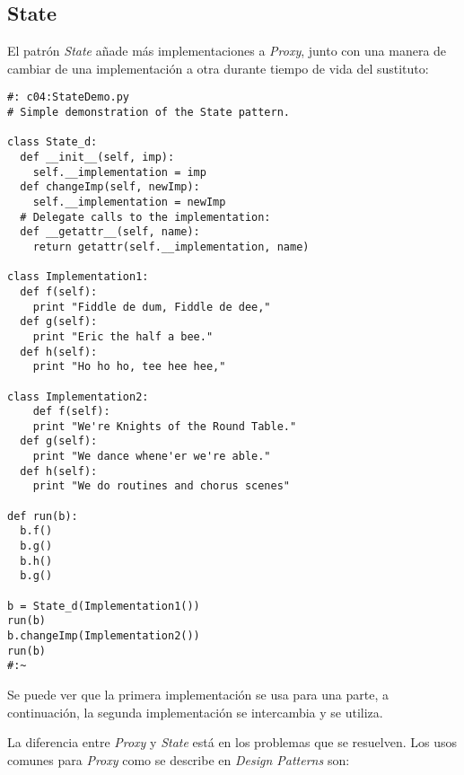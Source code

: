 \newpage

\subsection*{State}
\label{subsec:State}

El patrón \textit{State} añade más implementaciones a \textit{Proxy}, junto con una manera de cambiar de una implementación a otra durante tiempo de vida del sustituto: \newline

\begin{lstlisting} 
#: c04:StateDemo.py 
# Simple demonstration of the State pattern.

class State_d: 
  def __init__(self, imp):  
    self.__implementation = imp  
  def changeImp(self, newImp): 
    self.__implementation = newImp 
  # Delegate calls to the implementation: 
  def __getattr__(self, name): 
    return getattr(self.__implementation, name) 
    
class Implementation1: 
  def f(self):  
    print "Fiddle de dum, Fiddle de dee,"  
  def g(self):  
    print "Eric the half a bee."  
  def h(self):  
    print "Ho ho ho, tee hee hee,"  
    
class Implementation2: 
    def f(self):  
    print "We're Knights of the Round Table."  
  def g(self):  
    print "We dance whene'er we're able."  
  def h(self):  
    print "We do routines and chorus scenes"  
    
def run(b): 
  b.f() 
  b.g() 
  b.h() 
  b.g() 
  
b = State_d(Implementation1()) 
run(b) 
b.changeImp(Implementation2()) 
run(b) 
#:~ 
\end{lstlisting}

Se puede ver que la primera implementación se usa para una parte, a continuación, la segunda implementación se intercambia y se utiliza.     \newline

La diferencia entre \textit{Proxy} y \textit{State} está en los problemas que se resuelven. Los usos comunes para \textit{Proxy} como se describe en \textit{Design Patterns} son:

